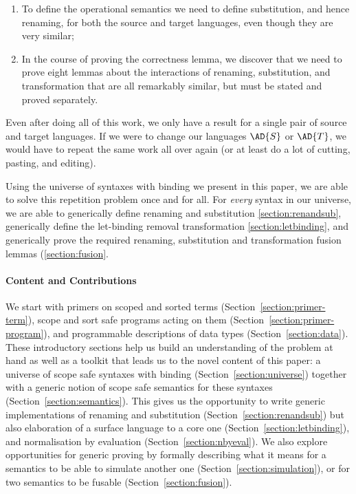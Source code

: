 \begin{enumerate}
\item To define the operational semantics we need to define
  substitution, and hence renaming, for both the source and target
  languages, even though they are very similar;
\item In the course of proving the correctness lemma, we discover that
  we need to prove eight lemmas about the interactions of renaming,
  substitution, and transformation that are all remarkably similar, but
  must be stated and proved separately. 
\end{enumerate}

Even after doing all of this work, we only have a result for a single
pair of source and target languages. If we were to change our
languages $\AD{S}$ or $\AD{T}$, we would have to repeat the same work
all over again (or at least do a lot of cutting, pasting, and
editing).

Using the universe of syntaxes with binding we present in this paper,
we are able to solve this repetition problem once and for all. For
\emph{every} syntax in our universe, we are able to generically define
renaming and substitution \ref{section:renandsub}, generically define
the let-binding removal transformation \ref{section:letbinding}, and
generically prove the required renaming, substitution and
transformation fusion lemmas (\ref{section:fusion}.

\paragraph{Content and Contributions}
We start with primers on scoped and sorted terms
(Section~\ref{section:primer-term}), scope and sort safe programs
acting on them (Section~\ref{section:primer-program}), and
programmable descriptions of data types (Section~\ref{section:data}).
These introductory sections help us build an understanding of the
problem at hand as well as a toolkit that leads us to the novel
content of this paper: a universe of scope safe syntaxes with binding
(Section~\ref{section:universe}) together with a generic notion of
scope safe semantics for these syntaxes
(Section~\ref{section:semantics}).  This gives us the opportunity to
write generic implementations of renaming and substitution
(Section~\ref{section:renandsub}) but also elaboration of a surface
language to a core one (Section~\ref{section:letbinding}), and
normalisation by evaluation (Section~\ref{section:nbyeval}). We also
explore opportunities for generic proving by formally describing what
it means for a semantics to be able to simulate another one
(Section~\ref{section:simulation}), or for two semantics to be fusable
(Section~\ref{section:fusion}).

